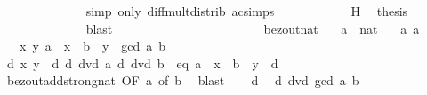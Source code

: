 \begin{isabellebody}
\ \ \ \ \ \ \ \ \ \ \ \ \isamarkupfalse%
\ {\isacharparenleft}{\kern0pt}simp\ only{\isacharcolon}{\kern0pt}\ diff{\isacharunderscore}{\kern0pt}mult{\isacharunderscore}{\kern0pt}distrib{}\ ac{\isacharunderscore}{\kern0pt}simps{\isacharparenright}{\kern0pt}\isanewline
\ \ \ \ \ \ \ \ \ \ \isamarkupfalse%
\ H{\isacharparenleft}{\kern0pt}{}{\isacharcomma}{\kern0pt}{}{\isacharparenright}{\kern0pt}\ \isamarkupfalse%
\ {\isacharquery}{\kern0pt}thesis\isanewline
\ \ \ \ \ \ \ \ \ \ \ \ \isamarkupfalse%
\ blast\isanewline
\ \ \ \ \ \ \ \ \isamarkupfalse%
\isanewline
\ \ \ \ \ \ \isamarkupfalse%
\isanewline
\ \ \ \ \isamarkupfalse%
\isanewline
\ \ \isamarkupfalse%
\isanewline
{}\isamarkupfalse%
%
\endisatagproof
{\isafoldproof}%
%
\isadelimproof
\isanewline
%
\endisadelimproof
\isanewline
{}\isamarkupfalse%
\ bezout{\isacharunderscore}{\kern0pt}nat{\isacharcolon}{\kern0pt}\isanewline
\ \ \ a\ {\isacharcolon}{\kern0pt}{\isacharcolon}{\kern0pt}\ nat\isanewline
\ \ \ a{\isacharcolon}{\kern0pt}\ {\isachardoublequoteopen}a\ {\isasymnoteq}\ {}{\isachardoublequoteclose}\isanewline
\ \ \ {\isachardoublequoteopen}{\isasymexists}x\ y{\isachardot}{\kern0pt}\ a\ {\isacharasterisk}{\kern0pt}\ x\ {\isacharequal}{\kern0pt}\ b\ {\isacharasterisk}{\kern0pt}\ y\ {\isacharplus}{\kern0pt}\ gcd\ a\ b{\isachardoublequoteclose}\isanewline
%
\isadelimproof
%
\endisadelimproof
%
\isatagproof
{}\isamarkupfalse%
\ {\isacharminus}{\kern0pt}\isanewline
\ \ \isamarkupfalse%
\ d\ x\ y\ \ d{\isacharcolon}{\kern0pt}\ {\isachardoublequoteopen}d\ dvd\ a{\isachardoublequoteclose}\ {\isachardoublequoteopen}d\ dvd\ b{\isachardoublequoteclose}\ \ eq{\isacharcolon}{\kern0pt}\ {\isachardoublequoteopen}a\ {\isacharasterisk}{\kern0pt}\ x\ {\isacharequal}{\kern0pt}\ b\ {\isacharasterisk}{\kern0pt}\ y\ {\isacharplus}{\kern0pt}\ d{\isachardoublequoteclose}\isanewline
\ \ \ \ \isamarkupfalse%
\ bezout{\isacharunderscore}{\kern0pt}add{\isacharunderscore}{\kern0pt}strong{\isacharunderscore}{\kern0pt}nat\ {\isacharbrackleft}{\kern0pt}OF\ a{\isacharcomma}{\kern0pt}\ of\ b{\isacharbrackright}{\kern0pt}\ \isamarkupfalse%
\ blast\isanewline
\ \ \isamarkupfalse%
\ d\ \isamarkupfalse%
\ {\isachardoublequoteopen}d\ dvd\ gcd\ a\ b{\isachardoublequoteclose}\isanewline

\end{isabellebody}
